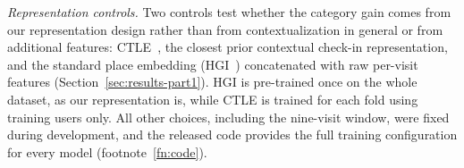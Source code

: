 \emph{Representation controls.} Two controls test whether the category gain comes from our representation design rather than from contextualization in general or from additional features: CTLE~\cite{lin2021ctle}, the closest prior contextual check-in representation, and the standard place embedding (HGI~\cite{huang2023hgi}) concatenated with raw per-visit features (Section~\ref{sec:results-part1}). HGI is pre-trained once on the whole dataset, as our
representation is, while CTLE is trained for each fold using training users only. All other choices, including the nine-visit window, were fixed during
development, and the released code provides the full training configuration for every model
(footnote~\ref{fn:code}).
